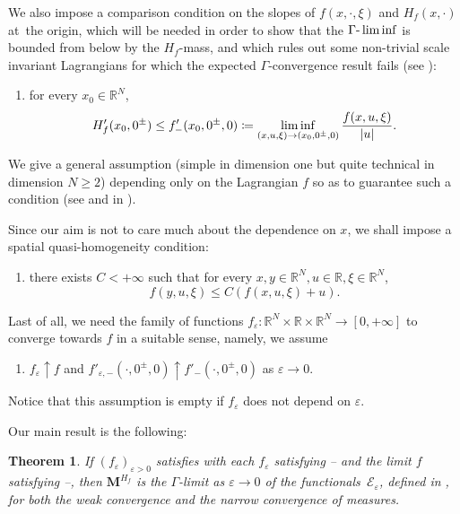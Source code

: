 \documentclass[10pt]{amsart}
\theoremstyle{plain}
\newtheorem{theorem}{Theorem}[section]
\theoremstyle{definition}
\newcommand{\R}{\mathbb{R}}
\newcommand{\ener}{\mathcal{E}}
\newcommand{\mass}{\boldsymbol{M}}
\newcommand{\eps}{\varepsilon}
\DeclarePairedDelimiter{\abs}{\lvert}{\rvert}
\begin{document}
We also impose a comparison condition on the slopes of \(f(x,\cdot,\xi)\) and $H_f(x,\cdot)$ at~the origin, which will be needed in order to show that the $\Gamma\textup{-}\liminf$ is bounded from below by the $H_f$-mass, and which rules out some non-trivial scale invariant Lagrangians for which the expected $\Gamma$-convergence result fails (see ):
\begin{enumerate}[\textnormal{(H}$_1$\textnormal{)},leftmargin=1.5\normalparindent,resume]
\item\label{hypSlope} for every $x_0\in \R^N$,
\begin{equation}\label{slopeInfSimplified}
H_f'(x_0,0^\pm) \leq f'_-(x_0,0^\pm,0)\coloneqq\displaystyle\liminf_{(x,u,\xi) \to (x_0,0^\pm,0)} \frac{f(x,u,\xi)}{\abs{u}}.
\end{equation}
\end{enumerate}
We give a general assumption (simple in dimension one but quite technical in dimension $N\geq 2$) depending only on the Lagrangian $f$ so as to guarantee such a condition (see  and  in ).

Since our aim is not to care much about the dependence on \(x\), we shall impose a spatial quasi-homogeneity condition:
\begin{enumerate}[\textnormal{(H}$_1$\textnormal{)},leftmargin=1.5\normalparindent,resume]
\item\label{hypQuasiHomogeneity} there exists $C < +\infty$ such that for every $x,y\in \R^N, u\in \R,\xi \in \R^N$,
\[f(y,u,\xi) \leq C (f(x,u,\xi) + u).\]
\end{enumerate}

Last of all, we need the family of functions $f_\eps:\R^N\times\R\times\R^N\to[0,+\infty]$ to converge towards \(f\) in a suitable sense, namely, we assume
\begin{enumerate}[\textnormal{(H}$_1$\textnormal{)},leftmargin=1.5\normalparindent,resume]
\item\label{hypGammaCv}
$f_\eps \uparrow f$ and $f'_{\eps,-}(\cdot,0^\pm,0) \uparrow f'_-(\cdot,0^\pm,0)$ as $\eps \to 0$.
\end{enumerate}
\noindent Notice that this assumption is empty if $f_\eps$ does not depend on $\eps$.

Our main result is the following:

\begin{theorem}\label{mainGammaConvergence}
If $(f_\eps)_{\eps > 0}$ satisfies  with each \(f_\eps\) satisfying -- and the limit \(f\) satisfying --, then \(\mass^{H_f}\) is the \(\Gamma\)-limit as \(\eps\to 0\) of the functionals~\(\ener_\eps\), defined in , for both the weak convergence and the narrow convergence of measures.
\end{theorem}
\end{document}
